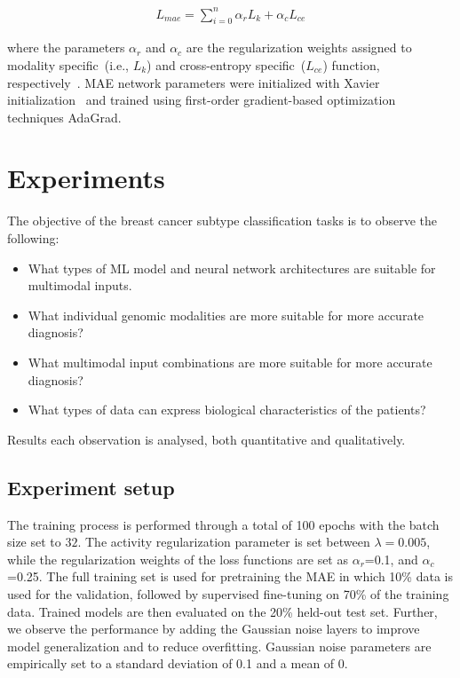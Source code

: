 \begin{align}
    L_{mae}=\sum_{i=0}^{n} \alpha_{r} {L}_{k}+\alpha_{c} {L}_{ce}
    \label{eq:sum}
\end{align}

\hspace*{3.5mm} where the parameters $\alpha_{r}$ and $\alpha_{c}$ are the regularization weights assigned to modality specific~(i.e., ${L}_{k}$) and cross-entropy specific~(${L}_{ce}$) function, respectively~\cite{mmdcae}. MAE network parameters were initialized with Xavier initialization~\cite{xavier} and trained using first-order gradient-based optimization techniques AdaGrad. 

\section{Experiments}\label{chapter_4:results}
The objective of the breast cancer subtype classification tasks is to observe the following:

\begin{itemize}[noitemsep]
    \item What types of ML model and neural network architectures are suitable for  multimodal inputs. 
    \item What individual genomic modalities are more suitable for more accurate diagnosis? 
    \item What multimodal input combinations are more suitable for more accurate diagnosis?
    \item What types of data can express biological characteristics of the patients? 
\end{itemize}

\hspace*{3.5mm} Results each observation is analysed, both quantitative and qualitatively. 

\subsection{Experiment setup}
The training process is performed through a total of 100 epochs with the batch size set to $32$. The activity regularization parameter is set between $\lambda=0.005$, while the regularization weights of the loss functions are set as $\alpha_{r}$=0.1, and $\alpha_{c}$=0.25. The full training set is used for pretraining the MAE in which 10\% data is used for the validation, followed by supervised fine-tuning on 70\% of the training data. Trained models are then evaluated on the 20\% held-out test set. Further, we observe the performance by adding the Gaussian noise layers to improve model generalization and to reduce overfitting. Gaussian noise parameters are empirically set to a standard deviation of 0.1 and a mean of 0. 

